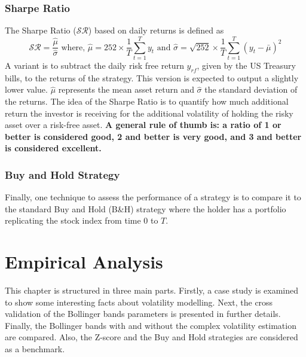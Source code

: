 \documentclass[11pt,a4,twosided,singlespacing,titlepagenumber=on]{scrreprt}
\numberwithin{equation}{chapter} %
\theoremstyle{remark}
\begin{document}
\subsection{Sharpe Ratio}
The Sharpe Ratio ($\mathcal{SR}$) based on daily returns is defined as
\begin{equation}
\mathcal{SR} =  \frac{\hat{\mu}}{\hat{\sigma}} \text{ where, } \hat{\mu} =  252  \times \frac{1}{T} \sum_{t=1}^T y_t \text{ and } \hat{\sigma} = \sqrt{252} \times \frac{1}{T} \sum_{t=1}^T (y_t - \bar{\mu})^2 \label{sharpe_ratio_def}
\end{equation}
A variant is to subtract the daily risk free return $y_{rf}$, given by the US Treasury bills, to the returns of the strategy. This version is expected to output a slightly lower value. $\hat{\mu}$ represents the mean asset return and $\hat{\sigma}$ the standard deviation of the returns. The idea of the Sharpe Ratio is to quantify how much additional return the investor is receiving for the additional volatility of holding the risky asset over a risk-free asset. \textbf{A general rule of thumb is: a ratio of 1 or better is considered good, 2 and better is very good, and 3 and better is considered excellent.} \\

\subsection{Buy and Hold Strategy}
Finally, one technique to assess the performance of a strategy is to compare it to the standard Buy and Hold (B\&H) strategy where the holder has a portfolio replicating the stock index from time 0 to $T$.

\chapter{Empirical Analysis}
This chapter is structured in three main parts. Firstly, a case study is examined to show some interesting facts about volatility modelling. Next, the cross validation of the Bollinger bands parameters is presented in further details. Finally, the Bollinger bands with and without the complex volatility estimation are compared. Also, the Z-score and the Buy and Hold strategies are considered as a benchmark.
\end{document}
